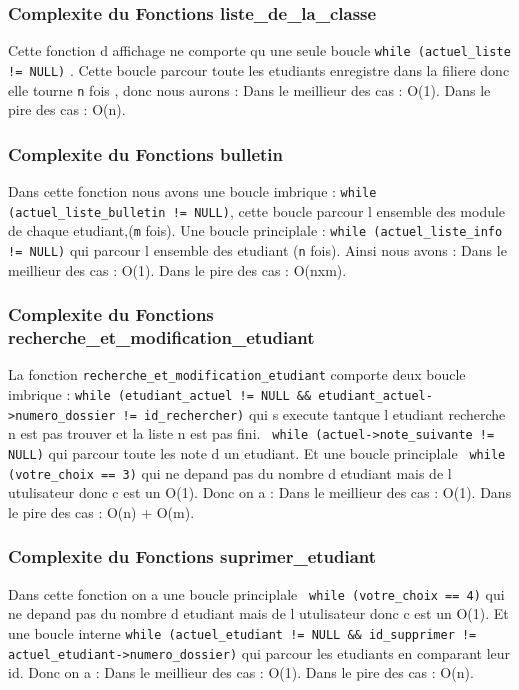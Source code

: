 \documentclass[12pt,a4paper]{article}
\begin{document}
\subsubsection{Complexite du Fonctions liste\_de\_la\_classe}
Cette fonction d affichage ne comporte qu une seule boucle \texttt{while (actuel\_liste != NULL)} . Cette boucle parcour toute les etudiants enregistre dans la filiere donc 
elle tourne \texttt{n} fois , donc nous aurons :
Dans le meillieur des cas : O(1).
Dans le pire des cas : O(n).








\subsubsection{Complexite du Fonctions bulletin}
Dans cette fonction nous avons une boucle imbrique : \texttt{while (actuel\_liste\_bulletin != NULL)}, cette boucle parcour l ensemble des module de chaque etudiant,(\texttt{m} fois).
Une boucle principlale : \texttt{while (actuel\_liste\_info != NULL)} qui parcour l ensemble des etudiant (\texttt{n} fois).
Ainsi nous avons :
Dans le meillieur des cas : O(1).
Dans le pire des cas : O(nxm).







\subsubsection{Complexite du Fonctions recherche\_et\_modification\_etudiant}
La fonction \texttt{recherche\_et\_modification\_etudiant} comporte deux boucle imbrique :
\texttt{while (etudiant\_actuel != NULL \&\& etudiant\_actuel->numero\_dossier != id\_rechercher)} qui s execute tantque l etudiant recherche n est pas trouver et la liste n est pas fini.
\texttt{ while (actuel->note\_suivante != NULL)} qui parcour toute les note d un etudiant.
Et une boucle principlale \texttt{ while (votre\_choix == 3)} qui ne depand pas du nombre d etudiant mais de l utulisateur donc c est un O(1).
Donc on a :
Dans le meillieur des cas : O(1).
Dans le pire des cas : O(n) + O(m).








\subsubsection{Complexite du Fonctions suprimer\_etudiant}
Dans cette fonction on a une boucle principlale \texttt{ while (votre\_choix == 4)} qui ne depand pas du nombre d etudiant mais de l utulisateur donc c est un O(1).
Et une boucle interne \texttt{while (actuel\_etudiant != NULL \&\& id\_supprimer != actuel\_etudiant->numero\_dossier)} qui parcour les etudiants en comparant leur id.
Donc on a :
Dans le meillieur des cas : O(1).
Dans le pire des cas : O(n).
\end{document}
